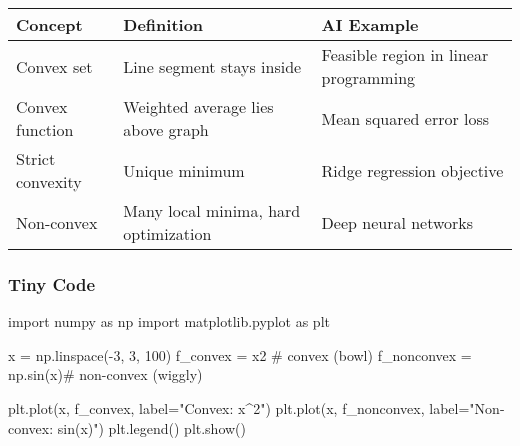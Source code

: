 \documentclass[
  letterpaper,
  DIV=11,
  numbers=noendperiod]{scrreprt}
\newenvironment{Shaded}{\begin{snugshade}}{\end{snugshade}}
\newcommand{\CommentTok}[1]{\textcolor[rgb]{0.37,0.37,0.37}{#1}}
\newcommand{\DecValTok}[1]{\textcolor[rgb]{0.68,0.00,0.00}{#1}}
\newcommand{\ImportTok}[1]{\textcolor[rgb]{0.00,0.46,0.62}{#1}}
\newcommand{\NormalTok}[1]{\textcolor[rgb]{0.00,0.23,0.31}{#1}}
\newcommand{\OperatorTok}[1]{\textcolor[rgb]{0.37,0.37,0.37}{#1}}
\newcommand{\StringTok}[1]{\textcolor[rgb]{0.13,0.47,0.30}{#1}}
\begin{document}
\begin{longtable}[]{@{}
  >{\raggedright\arraybackslash}p{}
  >{\raggedright\arraybackslash}p{}
  >{\raggedright\arraybackslash}p{}@{}}
\toprule\noalign{}
\begin{minipage}[b]{\linewidth}\raggedright
Concept
\end{minipage} & \begin{minipage}[b]{\linewidth}\raggedright
Definition
\end{minipage} & \begin{minipage}[b]{\linewidth}\raggedright
AI Example
\end{minipage} \\
\midrule\noalign{}
\endhead
\bottomrule\noalign{}
\endlastfoot
Convex set & Line segment stays inside & Feasible region in linear
programming \\
Convex function & Weighted average lies above graph & Mean squared error
loss \\
Strict convexity & Unique minimum & Ridge regression objective \\
Non-convex & Many local minima, hard optimization & Deep neural
networks \\
\end{longtable}

\subsubsection{Tiny Code}\label{tiny-code-141}

\begin{Shaded}
\begin{Highlighting}[]
\ImportTok{import}\NormalTok{ numpy }\ImportTok{as}\NormalTok{ np}
\ImportTok{import}\NormalTok{ matplotlib.pyplot }\ImportTok{as}\NormalTok{ plt}

\NormalTok{x }\OperatorTok{=}\NormalTok{ np.linspace(}\OperatorTok{{-}}\DecValTok{3}\NormalTok{, }\DecValTok{3}\NormalTok{, }\DecValTok{100}\NormalTok{)}
\NormalTok{f\_convex }\OperatorTok{=}\NormalTok{ x2        }\CommentTok{\# convex (bowl)}
\NormalTok{f\_nonconvex }\OperatorTok{=}\NormalTok{ np.sin(x)}\CommentTok{\# non{-}convex (wiggly)}

\NormalTok{plt.plot(x, f\_convex, label}\OperatorTok{=}\StringTok{"Convex: x\^{}2"}\NormalTok{)}
\NormalTok{plt.plot(x, f\_nonconvex, label}\OperatorTok{=}\StringTok{"Non{-}convex: sin(x)"}\NormalTok{)}
\NormalTok{plt.legend()}
\NormalTok{plt.show()}
\end{Highlighting}
\end{Shaded}
\end{document}
